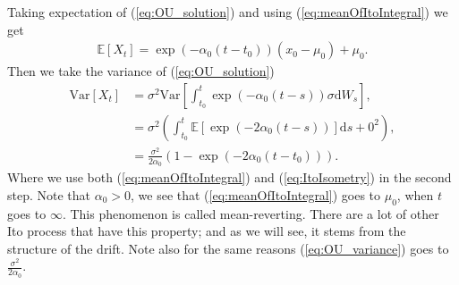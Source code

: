 Taking expectation of (\ref{eq:OU_solution}) and using (\ref{eq:meanOfItoIntegral}) we get
\begin{align}
    \mathbb{E}\left[X_t\right] = \exp\left(-\alpha_0\left(t - t_0\right)\right)\left(x_0 - \mu_0\right) + \mu_0. \label{eq:OU_mean}
\end{align}
Then we take the variance of (\ref{eq:OU_solution})
\begin{align}
    \mathrm{Var}\left[X_t\right] &= \sigma^2\mathrm{Var}\left[\int_{t_0}^t \exp\left(-\alpha_0 \left(t - s\right)\right)\sigma \mathrm{d}W_s\right],\nonumber \\
    & = \sigma^2\left(\int_{t_0}^t \mathbb{E}\left[\exp\left(-2\alpha_0\left(t - s\right)\right)\right] \mathrm{d}s + 0^2 \right), \nonumber \\
    & = \frac{\sigma^2}{2\alpha_0}\left(1 - \exp\left(-2\alpha_0(t - t_0)\right)\right). \label{eq:OU_variance}
\end{align}
Where we use both (\ref{eq:meanOfItoIntegral}) and (\ref{eq:ItoIsometry}) in the second step. Note that $\alpha_0 > 0$, we see that (\ref{eq:meanOfItoIntegral}) goes to $\mu_0$, when $t$ goes to $\infty$. This phenomenon is called mean-reverting. There are a lot of other Ito process that have this property; and as we will see, it stems from the structure of the drift. Note also for the same reasons (\ref{eq:OU_variance}) goes to $\frac{\sigma^2}{2\alpha_0}$.
